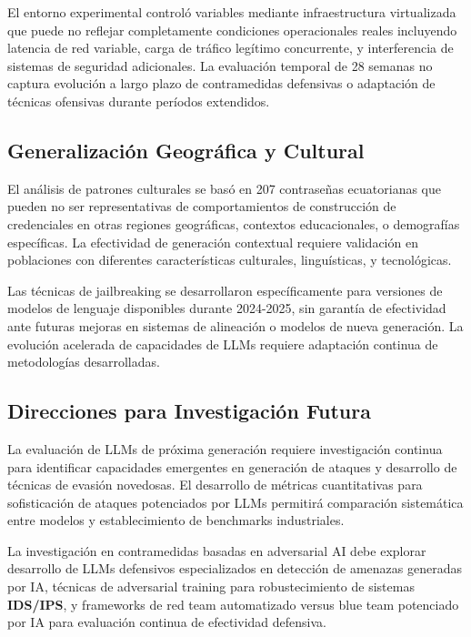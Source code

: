 El entorno experimental controló variables mediante infraestructura virtualizada que puede no reflejar completamente condiciones operacionales reales incluyendo latencia de red variable, carga de tráfico legítimo concurrente, y interferencia de sistemas de seguridad adicionales. La evaluación temporal de 28 semanas no captura evolución a largo plazo de contramedidas defensivas o adaptación de técnicas ofensivas durante períodos extendidos.

\subsection{Generalización Geográfica y Cultural}

El análisis de patrones culturales se basó en 207 contraseñas ecuatorianas que pueden no ser representativas de comportamientos de construcción de credenciales en otras regiones geográficas, contextos educacionales, o demografías específicas. La efectividad de generación contextual requiere validación en poblaciones con diferentes características culturales, linguísticas, y tecnológicas.

Las técnicas de jailbreaking se desarrollaron específicamente para versiones de modelos de lenguaje disponibles durante 2024-2025, sin garantía de efectividad ante futuras mejoras en sistemas de alineación o modelos de nueva generación. La evolución acelerada de capacidades de LLMs requiere adaptación continua de metodologías desarrolladas.

\subsection{Direcciones para Investigación Futura}

La evaluación de LLMs de próxima generación requiere investigación continua para identificar capacidades emergentes en generación de ataques y desarrollo de técnicas de evasión novedosas. El desarrollo de métricas cuantitativas para sofisticación de ataques potenciados por LLMs permitirá comparación sistemática entre modelos y establecimiento de benchmarks industriales.

La investigación en contramedidas basadas en adversarial AI debe explorar desarrollo de LLMs defensivos especializados en detección de amenazas generadas por IA, técnicas de adversarial training para robustecimiento de sistemas \textbf{IDS/IPS}, y frameworks de red team automatizado versus blue team potenciado por IA para evaluación continua de efectividad defensiva.


